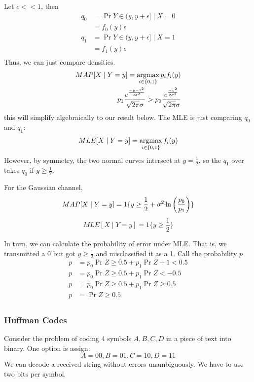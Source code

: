 Let $\epsilon << 1$, then
\begin{align*}
    q_0 &= \Pr{Y \in (y, y + \epsilon] \mid X = 0} \\
    &= f_0(y) \epsilon \\
    q_1 &= \Pr{Y \in (y, y + \epsilon] \mid X = 1} \\
    &= f_1(y) \epsilon \\
\end{align*}
Thus, we can just compare densities.
\begin{align*}
    MAP[X \mid Y = y] = \operatorname*{argmax}_{i \in \{0, 1\}} p_i f_i(y) \\
    p_1 \frac{e^{\frac{-{y - 1}^2}{2 \sigma^2}}}{\sqrt{2\pi} \sigma} > p_0 \frac{e^{\frac{-y^2}{2 \sigma^2}}}{\sqrt{2\pi} \sigma} \\
\end{align*}
this will simplify algebraically to our result below. The MLE is just comparing $q_0$ and $q_1$:
\begin{align*}
    MLE[X \mid Y = y] &= \operatorname*{argmax}_{i \in \{0, 1\}} f_i(y) \\
\end{align*}
However, by symmetry, the two normal curves intersect at $y = \frac{1}{2}$, so the $q_1$ over takes $q_0$ if $y \geq \frac12$.

\begin{theorem}
    For the Gaussian channel,
    \[ MAP[X \mid Y = y] = 1\{ y \geq \frac12 + \sigma^2 \ln\qty(\frac{p_0}{p_1})\}\]
    \[ MLE[X \mid Y = y] = 1\{ y \geq \frac12 \}\]
\end{theorem}

In turn, we can calculate the probability of error under MLE. That is, we transmitted a 0 but got $y \geq \frac12$ and misclassified it
as a 1. Call the probability $p$
\begin{align*}
    p &= p_0 \Pr{Z \geq 0.5} + p_1 \Pr{Z + 1 < 0.5} \\
    p &= p_0 \Pr{Z \geq 0.5} + p_1 \Pr{Z < -0.5} \\
    p &= p_0 \Pr{Z \geq 0.5} + p_1 \Pr{Z \geq 0.5} \\
    p &= \Pr{Z \geq 0.5} \\
\end{align*}

\subsubsection{Huffman Codes}

Consider the problem of coding 4 symbols $A, B, C, D$ in a piece of text into binary. One option is assign:
\[ A = 00, B = 01, C = 10, D = 11 \]
We can decode a received string without errors unambiguously. We have to use two bits per symbol.

